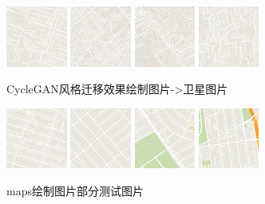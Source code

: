 \documentclass[conference]{IEEEtran}
\begin{document}
\begin{figure}[H]
	\centering
	\includegraphics[width=2cm]{PIC/maps/1033_A_fake_B.png}
	\includegraphics[width=2cm]{PIC/maps/1037_A_fake_B.png}
	\includegraphics[width=2cm]{PIC/maps/1039_A_fake_B.png}
	\includegraphics[width=2cm]{PIC/maps/1041_A_fake_B.png}
	\caption{CycleGAN风格迁移效果绘制图片->卫星图片}
\end{figure}

\begin{figure}[H]
	\centering
	\includegraphics[width=2cm]{PIC/maps/1033_A_real_B.png}
	\includegraphics[width=2cm]{PIC/maps/1037_A_real_B.png}
	\includegraphics[width=2cm]{PIC/maps/1039_A_real_B.png}
	\includegraphics[width=2cm]{PIC/maps/1041_A_real_B.png}
	\caption{maps绘制图片部分测试图片}
\end{figure}
\end{document}
